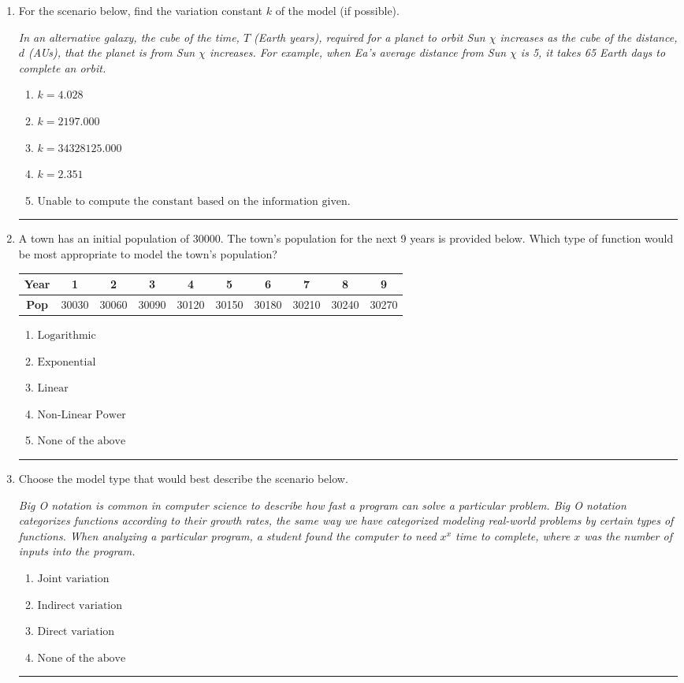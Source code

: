 \documentclass[14pt]{extbook}
\newcommand{\litem}[1]{\item#1\hspace*{-1cm}\rule{\textwidth}{0.4pt}}
\begin{document}
\begin{enumerate}
{\begin{enumerate}[label=\Alph*.]
\end{enumerate} }
\litem{
For the scenario below, find the variation constant $k$ of the model (if possible).
\begin{center}
    \textit{ In an alternative galaxy, the cube of the time, $T$ (Earth years), required for a planet to orbit Sun $\chi$ increases as the cube of the distance, $d$ (AUs), that the planet is from Sun $\chi$ increases. For example, when Ea's average distance from Sun $\chi$ is 5, it takes 65 Earth days to complete an orbit. }
\end{center}
\begin{enumerate}[label=\Alph*.]
\item \( k = 4.028 \)
\item \( k = 2197.000 \)
\item \( k = 34328125.000 \)
\item \( k = 2.351 \)
\item \( \text{Unable to compute the constant based on the information given.} \)

\end{enumerate} }
\litem{
A town has an initial population of 30000. The town's population for the next 9 years is provided below. Which type of function would be most appropriate to model the town's population?

\begin{tabular}{c|c|c|c|c|c|c|c|c|c}
\textbf{Year} &1 &2 &3 &4 &5 &6 &7 &8 &9\tabularnewline \hline
\textbf{Pop} &30030 &30060 &30090 &30120 &30150 &30180 &30210 &30240 &30270\end{tabular}\begin{enumerate}[label=\Alph*.]
\item \( \text{Logarithmic} \)
\item \( \text{Exponential} \)
\item \( \text{Linear} \)
\item \( \text{Non-Linear Power} \)
\item \( \text{None of the above} \)

\end{enumerate} }
\litem{
Choose the model type that would best describe the scenario below.
\begin{center}
    \textit{ Big O notation is common in computer science to describe how fast a program can solve a particular problem. Big O notation categorizes functions according to their growth rates, the same way we have categorized modeling real-world problems by certain types of functions. When analyzing a particular program, a student found the computer to need $x^x$ time to complete, where $x$ was the number of inputs into the program. }
\end{center}
\begin{enumerate}[label=\Alph*.]
\item \( \text{Joint variation} \)
\item \( \text{Indirect variation} \)
\item \( \text{Direct variation} \)
\item \( \text{None of the above} \)


\end{enumerate}}
\end{enumerate}
\end{document}
